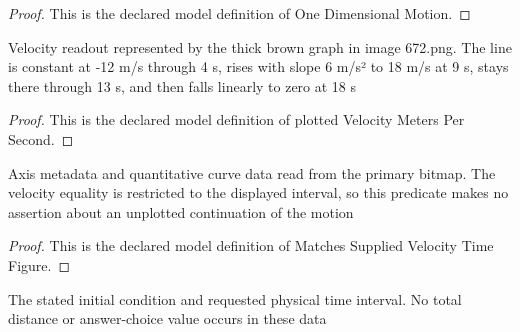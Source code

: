 \begin{proof}
  This is the declared model definition of One Dimensional Motion.
\end{proof}
\begin{definition}
  \label{def:physics:phyx-mini-0672:phyxminiproblems-problemphyxmini0672-plottedvelocitymeterspersecond}
  Velocity readout represented by the thick brown graph in image 672.png. The line is constant at -12 m/s through 4 s, rises with slope 6 m/s² to 18 m/s at 9 s, stays there through 13 s, and then falls linearly to zero at 18 s
\end{definition}
\begin{proof}
  This is the declared model definition of plotted Velocity Meters Per Second.
\end{proof}
\begin{definition}
  \label{def:physics:phyx-mini-0672:phyxminiproblems-problemphyxmini0672-matchessuppliedvelocitytimefigure}
  Axis metadata and quantitative curve data read from the primary bitmap. The velocity equality is restricted to the displayed interval, so this predicate makes no assertion about an unplotted continuation of the motion
\end{definition}
\begin{proof}
  This is the declared model definition of Matches Supplied Velocity Time Figure.
\end{proof}
\begin{definition}
  \label{def:physics:phyx-mini-0672:phyxminiproblems-problemphyxmini0672-matchesproblemstatement}
  The stated initial condition and requested physical time interval. No total distance or answer-choice value occurs in these data
\end{definition}
